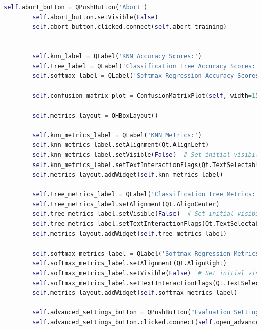 \documentclass[letterpaper,10pt]{article}
\begin{document}
\begin{lstlisting}[language=Python, caption=ui.py - Final structure after refactoring. ]
        self.abort_button = QPushButton('Abort')
        self.abort_button.setVisible(False)
        self.abort_button.clicked.connect(self.abort_training)


        self.knn_label = QLabel('KNN Accuracy Scores:')
        self.tree_label = QLabel('Classification Tree Accuracy Scores:')
        self.softmax_label = QLabel('Softmax Regression Accuracy Scores:')

        self.confusion_matrix_plot = ConfusionMatrixPlot(self, width=15, height=4, dpi=100)

        self.metrics_layout = QHBoxLayout()
        
        self.knn_metrics_label = QLabel('KNN Metrics:')
        self.knn_metrics_label.setAlignment(Qt.AlignLeft)
        self.knn_metrics_label.setVisible(False)  # Set initial visibility to False
        self.knn_metrics_label.setTextInteractionFlags(Qt.TextSelectableByMouse)
        self.metrics_layout.addWidget(self.knn_metrics_label)
        
        self.tree_metrics_label = QLabel('Classification Tree Metrics:')
        self.tree_metrics_label.setAlignment(Qt.AlignCenter)
        self.tree_metrics_label.setVisible(False)  # Set initial visibility to False
        self.tree_metrics_label.setTextInteractionFlags(Qt.TextSelectableByMouse)
        self.metrics_layout.addWidget(self.tree_metrics_label)
        
        self.softmax_metrics_label = QLabel('Softmax Regression Metrics:')
        self.softmax_metrics_label.setAlignment(Qt.AlignRight)
        self.softmax_metrics_label.setVisible(False)  # Set initial visibility to False
        self.softmax_metrics_label.setTextInteractionFlags(Qt.TextSelectableByMouse)
        self.metrics_layout.addWidget(self.softmax_metrics_label)

        self.advanced_settings_button = QPushButton("Evaluation Settings")
        self.advanced_settings_button.clicked.connect(self.open_advanced_settings) 



\end{lstlisting}
\end{document}
